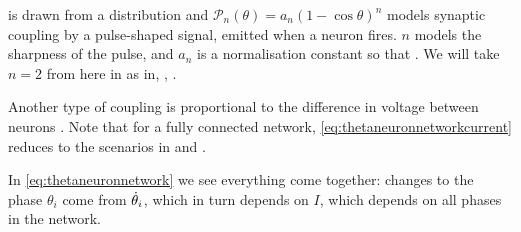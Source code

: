  is drawn from a distribution  and $\mathcal{P}_n(\theta)  = a_n(1 - \cos \theta)^n$ models synaptic coupling by a pulse-shaped signal, emitted when a neuron fires. $n$ models the sharpness of the pulse, and $a_n$ is a normalisation constant so that . We will take $n=2$ from here in as in\cite{Luke2013}, \cite{OttAntonsen2017}, \cite{Martens2020}. 


Another type of coupling is proportional to the difference in voltage between neurons \cite{Martens2020}. Note that for a fully connected network, \eqref{eq:thetaneuronnetworkcurrent} reduces to the scenarios in \cite{Luke2013} and \cite{Martens2020}.

In \eqref{eq:thetaneuronnetwork} we see everything come together: changes to the phase $\theta_i$ come from ${\dot{\theta}}_i$, which in turn depends on $I$, which depends on all phases in the network.



